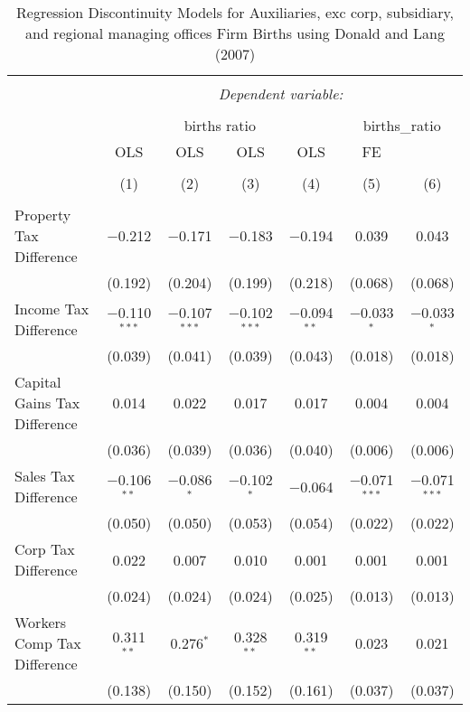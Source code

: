 
\begin{table}[!htbp] \centering 
  \caption{Regression Discontinuity Models for  Auxiliaries, exc corp, subsidiary, and regional managing offices Firm Births using Donald and Lang (2007)} 
  \label{} 
\begin{tabular}{@{\extracolsep{5pt}}lcccccc} 
\\[-1.8ex]\hline 
\hline \\[-1.8ex] 
 & \multicolumn{6}{c}{\textit{Dependent variable:}} \\ 
\cline{2-7} 
\\[-1.8ex] & \multicolumn{4}{c}{births ratio} & \multicolumn{2}{c}{births\_ratio} \\ 
 & OLS & OLS & OLS & OLS & FE &  \\ 
\\[-1.8ex] & (1) & (2) & (3) & (4) & (5) & (6)\\ 
\hline \\[-1.8ex] 
 Property Tax Difference & $-$0.212 & $-$0.171 & $-$0.183 & $-$0.194 & 0.039 & 0.043 \\ 
  & (0.192) & (0.204) & (0.199) & (0.218) & (0.068) & (0.068) \\ 
  Income Tax Difference & $-$0.110$^{***}$ & $-$0.107$^{***}$ & $-$0.102$^{***}$ & $-$0.094$^{**}$ & $-$0.033$^{*}$ & $-$0.033$^{*}$ \\ 
  & (0.039) & (0.041) & (0.039) & (0.043) & (0.018) & (0.018) \\ 
  Capital Gains Tax Difference & 0.014 & 0.022 & 0.017 & 0.017 & 0.004 & 0.004 \\ 
  & (0.036) & (0.039) & (0.036) & (0.040) & (0.006) & (0.006) \\ 
  Sales Tax Difference & $-$0.106$^{**}$ & $-$0.086$^{*}$ & $-$0.102$^{*}$ & $-$0.064 & $-$0.071$^{***}$ & $-$0.071$^{***}$ \\ 
  & (0.050) & (0.050) & (0.053) & (0.054) & (0.022) & (0.022) \\ 
  Corp Tax Difference & 0.022 & 0.007 & 0.010 & 0.001 & 0.001 & 0.001 \\ 
  & (0.024) & (0.024) & (0.024) & (0.025) & (0.013) & (0.013) \\ 
  Workers Comp Tax Difference & 0.311$^{**}$ & 0.276$^{*}$ & 0.328$^{**}$ & 0.319$^{**}$ & 0.023 & 0.021 \\ 
  & (0.138) & (0.150) & (0.152) & (0.161) & (0.037) & (0.037) \\ 

\end{tabular}
\end{table}
